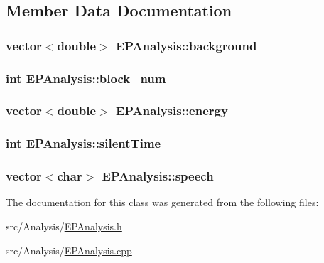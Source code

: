 \subsection{Member Data Documentation}
\hypertarget{class_e_p_analysis_a08a51e10aeea685b4ae0980b694c396a}{
\subsubsection[{background}]{\setlength{\rightskip}{0pt plus 5cm}vector$<$double$>$ E\+P\+Analysis\+::background\hspace{0.3cm}{\ttfamily [protected]}}}\label{class_e_p_analysis_a08a51e10aeea685b4ae0980b694c396a}
\hypertarget{class_e_p_analysis_ab9ee2c7ec0c37fd120489f625ad64cde}{
\subsubsection[{block\+\_\+num}]{\setlength{\rightskip}{0pt plus 5cm}int E\+P\+Analysis\+::block\+\_\+num\hspace{0.3cm}{\ttfamily [protected]}}}\label{class_e_p_analysis_ab9ee2c7ec0c37fd120489f625ad64cde}
\hypertarget{class_e_p_analysis_a16d60a56e47c6fd90658dd564badfad3}{
\subsubsection[{energy}]{\setlength{\rightskip}{0pt plus 5cm}vector$<$double$>$ E\+P\+Analysis\+::energy\hspace{0.3cm}{\ttfamily [protected]}}}\label{class_e_p_analysis_a16d60a56e47c6fd90658dd564badfad3}
\hypertarget{class_e_p_analysis_a16dfd308b2c4ba9cfc63be3b8867da6a}{
\subsubsection[{silent\+Time}]{\setlength{\rightskip}{0pt plus 5cm}int E\+P\+Analysis\+::silent\+Time\hspace{0.3cm}{\ttfamily [protected]}}}\label{class_e_p_analysis_a16dfd308b2c4ba9cfc63be3b8867da6a}
\hypertarget{class_e_p_analysis_a349b8500c98d922a49610f2c801ab7ec}{
\subsubsection[{speech}]{\setlength{\rightskip}{0pt plus 5cm}vector$<$char$>$ E\+P\+Analysis\+::speech\hspace{0.3cm}{\ttfamily [protected]}}}\label{class_e_p_analysis_a349b8500c98d922a49610f2c801ab7ec}


The documentation for this class was generated from the following files\+:\begin{DoxyCompactItemize}
\item 
src/\+Analysis/\hyperlink{_e_p_analysis_8h}{E\+P\+Analysis.\+h}\item 
src/\+Analysis/\hyperlink{_e_p_analysis_8cpp}{E\+P\+Analysis.\+cpp}\end{DoxyCompactItemize}
